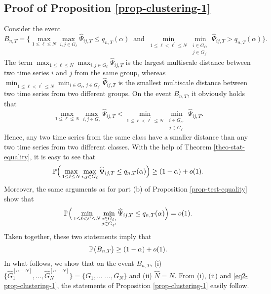 \documentclass[a4paper,12pt]{article}
\begin{document}
\subsection*{Proof of Proposition \ref{prop-clustering-1}}


Consider the event  
\[ B_{n,T} = \Big\{ \max_{1 \le \ell \le N} \max_{i,j \in G_\ell} \widehat{\Psi}_{ij,T} \le q_{n,T}(\alpha) \ \text{ and } \ \min_{1 \le \ell < \ell^\prime \le N} \min_{\substack{i \in G_\ell, \\ j \in G_{\ell^\prime}}} \widehat{\Psi}_{ij,T} > q_{n,T}(\alpha) \Big\}. \]
The term $\max_{1 \le \ell \le N} \max_{i,j \in G_\ell} \widehat{\Psi}_{ij,T}$ is the largest multiscale distance between two time series $i$ and $j$ from the same group, whereas $\min_{1 \le \ell < \ell^\prime \le N} \min_{i \in G_\ell, \, j \in G_{\ell^\prime}} \widehat{\Psi}_{ij,T}$ is the smallest multiscale distance between two time series from two different groups. On the event $B_{n,T}$, it obviously holds that 
\begin{equation}\label{eq1-prop-clustering-1}
\max_{1 \le \ell \le N} \max_{i,j \in G_\ell} \widehat{\Psi}_{ij,T} < \min_{1 \le \ell < \ell^\prime \le N} \min_{\substack{i \in G_\ell, \\ j \in G_{\ell^\prime}}} \widehat{\Psi}_{ij,T}. 
\end{equation}
Hence, any two time series from the same class have a smaller distance than any two time series from two different classes. With the help of Theorem \ref{theo-stat-equality}, it is easy to see that
\[  \mathbb{P} \Big( \max_{1 \le \ell \le N} \max_{i,j \in G_\ell} \widehat{\Psi}_{ij,T} \le q_{n,T}(\alpha) \Big) \ge (1 - \alpha) + o(1). \]
Moreover, the same arguments as for part (b) of Proposition \ref{prop-test-equality} show that 
\[  \mathbb{P} \Big( \min_{1 \le \ell < \ell^\prime \le N} \min_{\substack{i \in G_\ell, \\ j \in G_{\ell^\prime}}} \widehat{\Psi}_{ij,T} \le q_{n,T}(\alpha) \Big) = o(1). \]
Taken together, these two statements imply that 
\begin{equation}\label{eq2-prop-clustering-1}
\mathbb{P} \big( B_{n,T} \big) \ge (1-\alpha) + o(1). 
\end{equation}
In what follows, we show that on the event $B_{n,T}$, (i) $\{ \widehat{G}_1^{[n-N]},\ldots,\widehat{G}_N^{[n-N]} \big\} = \big\{ G_1,\ldots$ $\ldots,G_N \}$ and (ii) $\widehat{N} = N$. From (i), (ii) and \eqref{eq2-prop-clustering-1}, the statements of Proposition \ref{prop-clustering-1} easily follow. 
\end{document}
